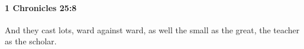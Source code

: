 
		\paragraph{1 Chronicles 25:8} %
			\label{1CHRONICLES-25-8}

			And they cast lots, ward against ward, as well the small as the great, the teacher as the scholar.


